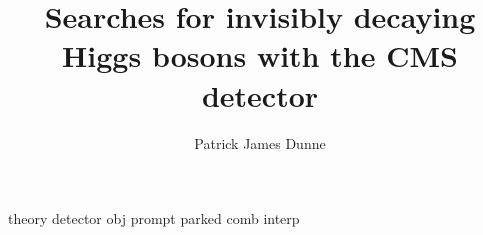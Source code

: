 \documentclass{thesis}
\title{Searches for invisibly decaying Higgs bosons with the CMS detector}
\author{Patrick James Dunne}
\begin{document}
\begin{frontmatter}
  
\end{frontmatter}

\begin{mainmatter}
  {theory}
  {detector}
  {obj}
  {prompt}
  {parked}
  {comb}
  {interp}

\end{mainmatter}

\begin{appendices}
  
\end{appendices}

\begin{backmatter}
  
\end{backmatter}

\end{document}
